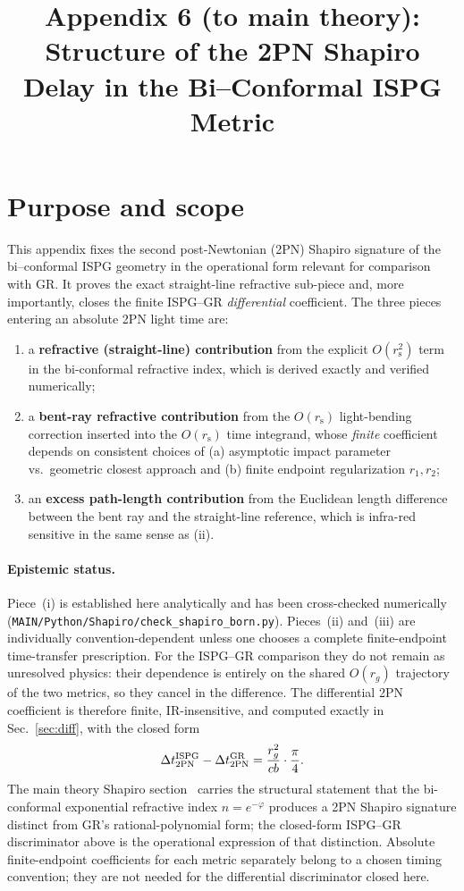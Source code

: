 \documentclass[11pt]{article}
\title{Appendix 6 (to main theory): Structure of the 2PN Shapiro Delay in the Bi--Conformal ISPG Metric}
\author{}
\date{}
\newcommand{\rs}{r_{\mathrm{s}}}
\begin{document}
\let\phi\varphi
\maketitle

\section*{Purpose and scope}
This appendix fixes the second post-Newtonian (2PN) Shapiro
signature of the bi--conformal ISPG geometry in the operational
form relevant for comparison with GR.  It proves the exact
straight-line refractive sub-piece and, more importantly, closes
the finite ISPG--GR \emph{differential} coefficient.  The three
pieces entering an absolute 2PN light time are:

\begin{enumerate}
\item a \textbf{refractive (straight-line) contribution} from
the explicit $O(\rs^2)$ term in the bi-conformal refractive
index, which is derived exactly and verified numerically;
\item a \textbf{bent-ray refractive contribution} from the
$O(\rs)$ light-bending correction inserted into the $O(\rs)$
time integrand, whose \emph{finite} coefficient depends on
consistent choices of (a) asymptotic impact parameter vs.\
geometric closest approach and (b) finite endpoint
regularization $r_1,r_2$;
\item an \textbf{excess path-length contribution} from the
Euclidean length difference between the bent ray and the
straight-line reference, which is infra-red sensitive in the
same sense as (ii).
\end{enumerate}

\paragraph{Epistemic status.}
Piece~(i) is established here analytically and has been
cross-checked numerically
(\texttt{MAIN/Python/Shapiro/check\_shapiro\_born.py}).  Pieces~(ii)
and~(iii) are individually convention-dependent unless one
chooses a complete finite-endpoint time-transfer prescription.
For the ISPG--GR comparison they do not remain as unresolved physics:
their dependence is entirely on the shared $O(r_g)$ trajectory
of the two metrics, so they cancel in the difference.  The
differential 2PN coefficient is therefore finite, IR-insensitive,
and computed exactly in Sec.~\ref{sec:diff}, with the closed form
\[
\Delta t_{2{\rm PN}}^{\rm ISPG}-\Delta t_{2{\rm PN}}^{\rm GR}
=\frac{r_g^2}{cb}\cdot\frac{\pi}{4}.
\]
The main theory Shapiro section~\cite{Lotishvili2026} carries the structural statement
that the bi-conformal exponential refractive index
$n=e^{-\phi}$ produces a 2PN Shapiro signature distinct from
GR's rational-polynomial form; the closed-form ISPG--GR
discriminator above is the operational expression of that
distinction.  Absolute finite-endpoint coefficients for each
metric separately belong to a chosen timing convention; they are
not needed for the differential discriminator closed here.
\end{document}
